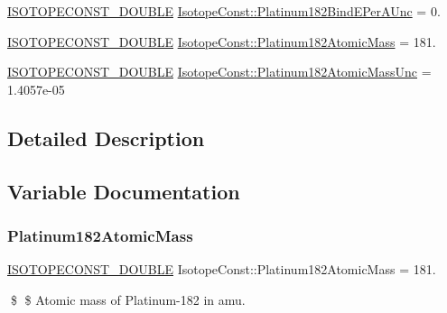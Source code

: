 \begin{DoxyCompactItemize}
\mbox{\hyperlink{group___isotope_const-_macros_ga8f45a7272ce02c0b4c65c44636ed719a}{I\+S\+O\+T\+O\+P\+E\+C\+O\+N\+S\+T\+\_\+\+D\+O\+U\+B\+LE}} \mbox{\hyperlink{group___isotope_const-_platinum-_pt182_gad99a15f912b333460c794efc474d6b6b}{Isotope\+Const\+::\+Platinum182\+Bind\+E\+Per\+A\+Unc}} = 0.
\item 
\mbox{\hyperlink{group___isotope_const-_macros_ga8f45a7272ce02c0b4c65c44636ed719a}{I\+S\+O\+T\+O\+P\+E\+C\+O\+N\+S\+T\+\_\+\+D\+O\+U\+B\+LE}} \mbox{\hyperlink{group___isotope_const-_platinum-_pt182_ga210b36583ec1e4dfd20022bca4d51b57}{Isotope\+Const\+::\+Platinum182\+Atomic\+Mass}} = 181.
\item 
\mbox{\hyperlink{group___isotope_const-_macros_ga8f45a7272ce02c0b4c65c44636ed719a}{I\+S\+O\+T\+O\+P\+E\+C\+O\+N\+S\+T\+\_\+\+D\+O\+U\+B\+LE}} \mbox{\hyperlink{group___isotope_const-_platinum-_pt182_ga5b43da7e83a3d4c1cf889a4599cd8229}{Isotope\+Const\+::\+Platinum182\+Atomic\+Mass\+Unc}} = 1.\+4057e-\/05
\end{DoxyCompactItemize}


\subsection{Detailed Description}


\subsection{Variable Documentation}
\mbox{\label{group___isotope_const-_platinum-_pt182_ga210b36583ec1e4dfd20022bca4d51b57}} 
\subsubsection{\texorpdfstring{Platinum182\+Atomic\+Mass}{Platinum182AtomicMass}}
{\footnotesize\ttfamily \mbox{\hyperlink{group___isotope_const-_macros_ga8f45a7272ce02c0b4c65c44636ed719a}{I\+S\+O\+T\+O\+P\+E\+C\+O\+N\+S\+T\+\_\+\+D\+O\+U\+B\+LE}} Isotope\+Const\+::\+Platinum182\+Atomic\+Mass = 181.}

\$ \$ Atomic mass of Platinum-\/182 in amu. \mbox{\label{group___isotope_const-_platinum-_pt182_ga5b43da7e83a3d4c1cf889a4599cd8229}} 
